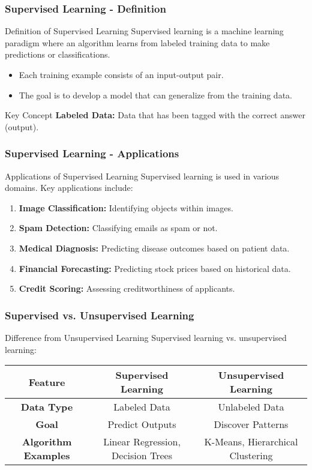 \documentclass[aspectratio=169]{beamer}
\begin{document}
\begin{frame}[fragile]
    \frametitle{Supervised Learning - Definition}
    \begin{block}{Definition of Supervised Learning}
        Supervised learning is a machine learning paradigm where an algorithm learns from labeled training data to make predictions or classifications. 
    \end{block}
    \begin{itemize}
        \item Each training example consists of an input-output pair.
        \item The goal is to develop a model that can generalize from the training data.
    \end{itemize}
    \begin{block}{Key Concept}
        \textbf{Labeled Data:} Data that has been tagged with the correct answer (output).
    \end{block}
\end{frame}

\begin{frame}[fragile]
    \frametitle{Supervised Learning - Applications}
    \begin{block}{Applications of Supervised Learning}
        Supervised learning is used in various domains. Key applications include:
    \end{block}
    \begin{enumerate}
        \item \textbf{Image Classification:} Identifying objects within images.
        \item \textbf{Spam Detection:} Classifying emails as spam or not.
        \item \textbf{Medical Diagnosis:} Predicting disease outcomes based on patient data.
        \item \textbf{Financial Forecasting:} Predicting stock prices based on historical data.
        \item \textbf{Credit Scoring:} Assessing creditworthiness of applicants.
    \end{enumerate}
\end{frame}

\begin{frame}[fragile]
    \frametitle{Supervised vs. Unsupervised Learning}
    \begin{block}{Difference from Unsupervised Learning}
        Supervised learning vs. unsupervised learning:
    \end{block}
    \begin{tabular}{|c|c|c|}
        \hline
        \textbf{Feature} & \textbf{Supervised Learning} & \textbf{Unsupervised Learning} \\
        \hline
        \textbf{Data Type} & Labeled Data & Unlabeled Data \\
        \textbf{Goal} & Predict Outputs & Discover Patterns \\
        \textbf{Algorithm Examples} & Linear Regression, Decision Trees & K-Means, Hierarchical Clustering \\
        \hline
    \end{tabular}
\end{frame}
\end{document}
